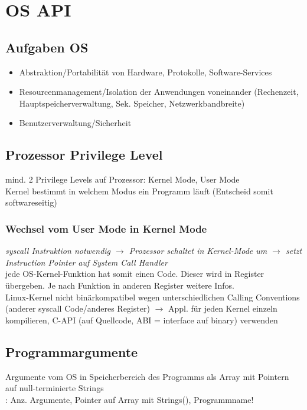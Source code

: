 \section{OS API}
\subsection{Aufgaben OS}
\begin{itemize}
    \item Abstraktion/Portabilität von Hardware, Protokolle, Software-Services
    \item Resourcenmanagement/Isolation der Anwendungen voneinander (Rechenzeit, Hauptspeicherverwaltung, Sek. Speicher, Netzwerkbandbreite)
    \item Benutzerverwaltung/Sicherheit
\end{itemize}
\subsection{Prozessor Privilege Level}
mind. 2 Privilege Levels auf Prozessor: Kernel Mode, User Mode\\
Kernel bestimmt in welchem Modus ein Programm läuft (Entscheid somit softwareseitig)

\subsubsection{Wechsel vom User Mode in Kernel Mode}
\textit{syscall Instruktion notwendig $\rightarrow$ Prozessor schaltet in Kernel-Mode um $\rightarrow$ setzt Instruction Pointer auf System Call Handler\\}
jede OS-Kernel-Funktion hat somit einen Code. Dieser wird in Register übergeben. Je nach Funktion in anderen Register weitere Infos.\\
Linux-Kernel nicht binärkompatibel wegen unterschiedlichen Calling Conventions (anderer syscall Code/anderes Register) $\rightarrow$ Appl. für jeden Kernel einzeln kompilieren, C-API (auf Quellcode, ABI = interface auf binary) verwenden

\subsection{Programmargumente}
Argumente vom OS in Speicherbereich des Programms als Array mit Pointern auf null-terminierte Strings\\
:  Anz. Argumente,  Pointer auf Array mit Strings(),  Programmname!

